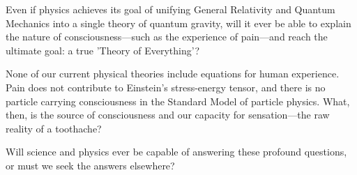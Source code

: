 Even if physics achieves its goal of unifying General Relativity and Quantum Mechanics into a single theory of quantum gravity, will it ever be able to explain the nature of consciousness—such as the experience of pain—and reach the ultimate goal: a true 'Theory of Everything'?

None of our current physical theories include equations for human experience. Pain does not contribute to Einstein’s stress-energy tensor, and there is no particle carrying consciousness in the Standard Model of particle physics. What, then, is the source of consciousness and our capacity for sensation—the raw reality of a toothache?

Will science and physics ever be capable of answering these profound questions, or must we seek the answers elsewhere?
